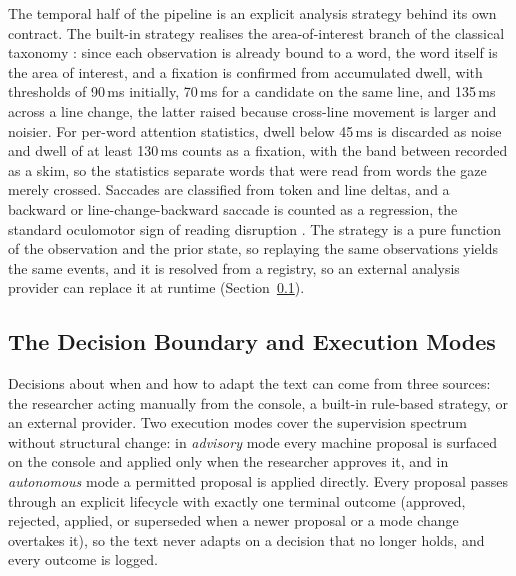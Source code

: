 The temporal half of the pipeline is an explicit analysis strategy behind its own contract.
The built-in strategy realises the area-of-interest branch of the classical taxonomy \cite{salvucci2000identifying}: since each observation is already bound to a word, the word itself is the area of interest, and a fixation is confirmed from accumulated dwell, with thresholds of 90\,ms initially, 70\,ms for a candidate on the same line, and 135\,ms across a line change, the latter raised because cross-line movement is larger and noisier.
For per-word attention statistics, dwell below 45\,ms is discarded as noise and dwell of at least 130\,ms counts as a fixation, with the band between recorded as a skim, so the statistics separate words that were read from words the gaze merely crossed.
Saccades are classified from token and line deltas, and a backward or line-change-backward saccade is counted as a regression, the standard oculomotor sign of reading disruption \cite{rayner1998eyemovements}.
The strategy is a pure function of the observation and the prior state, so replaying the same observations yields the same events, and it is resolved from a registry, so an external analysis provider can replace it at runtime (Section~\ref{sec:platform-decision}).

\subsection{The Decision Boundary and Execution Modes}
\label{sec:platform-decision}

Decisions about when and how to adapt the text can come from three sources: the researcher acting manually from the console, a built-in rule-based strategy, or an external provider.
Two execution modes cover the supervision spectrum without structural change: in \emph{advisory} mode every machine proposal is surfaced on the console and applied only when the researcher approves it, and in \emph{autonomous} mode a permitted proposal is applied directly.
Every proposal passes through an explicit lifecycle with exactly one terminal outcome (approved, rejected, applied, or superseded when a newer proposal or a mode change overtakes it), so the text never adapts on a decision that no longer holds, and every outcome is logged.

